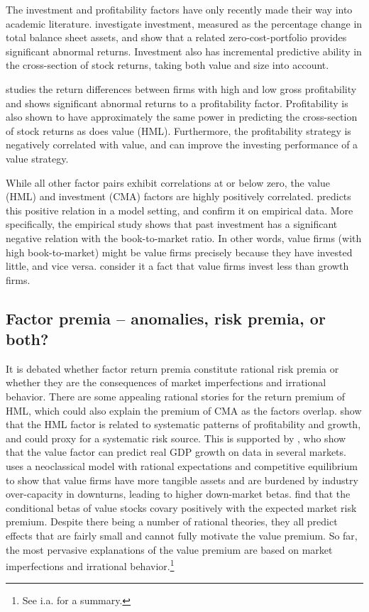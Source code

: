 The investment and profitability factors have only recently made their way into academic literature. \textcite{CooperGulenSchill2008} investigate investment, measured as the percentage change in total balance sheet assets, and show that a related zero-cost-portfolio provides significant abnormal returns. Investment also has incremental predictive ability in the cross-section of stock returns, taking both value and size into account.

\textcite{NovyMarx2013} studies the return differences between firms with high and low gross profitability and shows significant abnormal returns to a profitability factor. Profitability is also shown to have approximately the same power in predicting the cross-section of stock returns as does value (HML). Furthermore, the profitability strategy is negatively correlated with value, and can improve the investing performance of a value strategy.

While all other factor pairs exhibit correlations at or below zero, the value (HML) and investment (CMA) factors are highly positively correlated. \textcite{Zhang2005} predicts this positive relation in a model setting, and \textcite{AndersonGarciaFeijoo2006} confirm it on empirical data. More specifically, the empirical study shows that past investment has a significant negative relation with the book-to-market ratio. In other words, value firms (with high book-to-market) might be value firms precisely because they have invested little, and vice versa. \textcite{FF2015} consider it a fact that value firms invest less than growth firms.

\subsection{Factor premia -- anomalies, risk premia, or both?}
It is debated whether factor return premia constitute rational risk premia or whether they are the consequences of market imperfections and irrational behavior. There are some appealing rational stories for the return premium of HML, which could also explain the premium of CMA as the factors overlap. \textcite{FamaFrench1993} show that the HML factor is related to systematic patterns of profitability and growth, and could proxy for a systematic risk source. This is supported by \textcite{LiewVassalou2000}, who show that the value factor can predict real GDP growth on data in several markets. \textcite{Zhang2005} uses a neoclassical model with rational expectations and competitive equilibrium to show that value firms have more tangible assets and are burdened by industry over-capacity in downturns, leading to higher down-market betas. \textcite{PetkovaZhang2005} find that the conditional betas of value stocks covary positively with the expected market risk premium. Despite there being a number of rational theories, they all predict effects that are fairly small and cannot fully motivate the value premium. So far, the most pervasive explanations of the value premium are based on market imperfections and irrational behavior.\footnote{See i.a. \textcite{Ilmanen2011} for a summary.}

